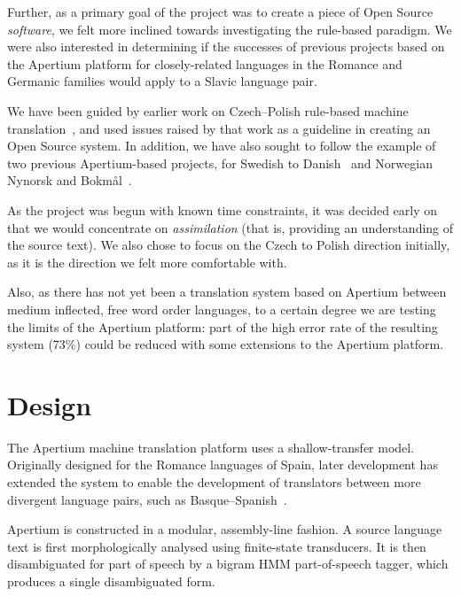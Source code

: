 \documentclass[11pt]{article}
\begin{document}
Further, as a primary goal of the project was to create a piece
of Open Source \textit{software}, we felt more inclined towards
investigating the rule-based paradigm. We were also interested
in determining if the successes of previous projects based on
the Apertium platform for closely-related languages in the Romance
and Germanic families would apply to a Slavic language 
pair. %

We have been guided by earlier work on Czech--Polish rule-based machine translation~\citep{Debowski02}, 
and used issues raised by that work as a guideline in creating an Open Source system. In addition, we 
have also sought to follow the example of two previous Apertium-based projects, for Swedish to 
Danish~\citep{tyers2009rfr} and Norwegian Nynorsk and Bokm{\aa}l~\citep{unhammer2009rfr}.

As the project was begun with known time constraints, it was decided early on that we would 
concentrate on \emph{assimilation} (that is, providing an understanding of the source text). 
We also chose to focus on the Czech to Polish direction initially, as it is the direction 
we felt more comfortable with. 

Also, as there has not yet been a translation system based on Apertium between
medium inflected, free word order languages, to a certain degree we are testing
the limits of the Apertium platform: part of the high error rate of the resulting
system (73\%) could be reduced with some extensions to the Apertium platform.

\section{Design}
The Apertium machine translation platform uses a shallow-transfer model.
Originally designed for the Romance languages of Spain, later development has
extended the system to enable the development of translators between more
divergent language pairs, such as Basque--Spanish~\citep{ginestirosell09}.

Apertium is constructed in a modular, assembly-line fashion. 
A source language text is first morphologically analysed using finite-state 
transducers. It is then disambiguated for part of speech by a bigram HMM 
part-of-speech tagger, which produces a single disambiguated form.
\end{document}
